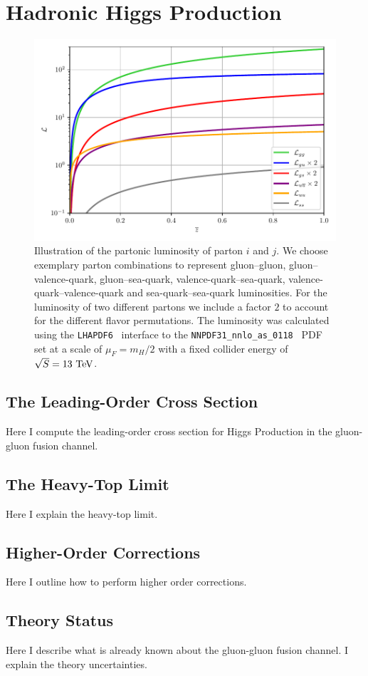 
\chapter{Hadronic Higgs Production}\label{chap:three}

\begin{figure}
  \centering
  \includegraphics[width=\figurewidth]{Images/luminosity.pdf}
  \caption{Illustration of the partonic luminosity of parton $i$ and $j$. We choose exemplary parton combinations to represent gluon--gluon, gluon--valence-quark, gluon--sea-quark, valence-quark--sea-quark, valence-quark--valence-quark and sea-quark--sea-quark luminosities. For the luminosity of two different partons we include a factor $2$ to account for the different flavor permutations. The luminosity was calculated using the \texttt{LHAPDF6}~\cite{Buckley:2014ana} interface to the \texttt{NNPDF31\_nnlo\_as\_0118}~\cite{NNPDF:2017mvq} \acs{PDF} set at a scale of $\mu_F=m_H/2$ with a fixed collider energy of $\sqrt{S} = 13 \text{ TeV}$.}
\end{figure}

\section{The Leading-Order Cross Section}
Here I compute the leading-order cross section for Higgs Production in the gluon-gluon fusion channel.
\section{The Heavy-Top Limit}
Here I explain the heavy-top limit.
\section{Higher-Order Corrections}
Here I outline how to perform higher order corrections.
\section{Theory Status}
Here I describe what is already known about the gluon-gluon fusion channel. I explain the theory uncertainties.

